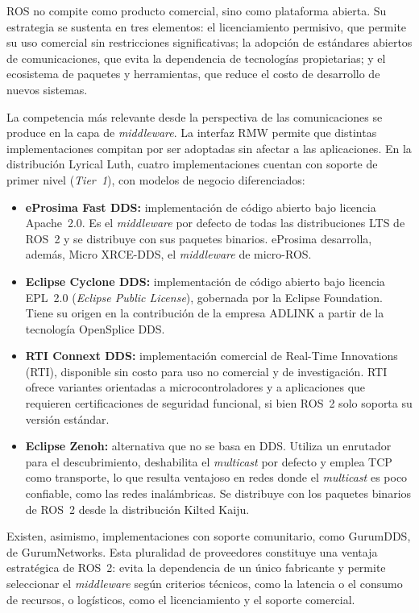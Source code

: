 ROS no compite como producto comercial, sino como plataforma abierta. Su
estrategia se sustenta en tres elementos: el licenciamiento permisivo, que
permite su uso comercial sin restricciones significativas; la adopción de
estándares abiertos de comunicaciones, que evita la dependencia de tecnologías
propietarias; y el ecosistema de paquetes y herramientas, que reduce el costo
de desarrollo de nuevos sistemas.

La competencia más relevante desde la perspectiva de las comunicaciones se
produce en la capa de \textit{middleware}. La interfaz RMW permite que
distintas implementaciones compitan por ser adoptadas sin afectar a las
aplicaciones. En la distribución Lyrical Luth, cuatro implementaciones cuentan
con soporte de primer nivel (\textit{Tier~1}), con modelos de negocio
diferenciados:
\begin{itemize}
    \item \textbf{eProsima Fast DDS:} implementación de código abierto bajo
    licencia Apache~2.0. Es el \textit{middleware} por defecto de todas las
    distribuciones LTS de ROS~2 y se distribuye con sus paquetes binarios.
    eProsima desarrolla, además, Micro XRCE-DDS, el \textit{middleware} de
    micro-ROS.
    \item \textbf{Eclipse Cyclone DDS:} implementación de código abierto bajo
    licencia EPL~2.0 (\textit{Eclipse Public License}), gobernada por la
    Eclipse Foundation. Tiene su origen en la contribución de la empresa ADLINK
    a partir de la tecnología OpenSplice DDS.
    \item \textbf{RTI Connext DDS:} implementación comercial de Real-Time
    Innovations (RTI), disponible sin costo para uso no comercial y de
    investigación. RTI ofrece variantes orientadas a microcontroladores y a
    aplicaciones que requieren certificaciones de seguridad funcional, si
    bien ROS~2 solo soporta su versión estándar.
    \item \textbf{Eclipse Zenoh:} alternativa que no se basa en DDS. Utiliza
    un enrutador para el descubrimiento, deshabilita el \textit{multicast} por
    defecto y emplea TCP como transporte, lo que resulta ventajoso en redes
    donde el \textit{multicast} es poco confiable, como las redes
    inalámbricas. Se distribuye con los paquetes binarios de ROS~2 desde la
    distribución Kilted Kaiju.
\end{itemize}

Existen, asimismo, implementaciones con soporte comunitario, como GurumDDS, de
GurumNetworks. Esta pluralidad de proveedores constituye una ventaja
estratégica de ROS~2: evita la dependencia de un único fabricante y permite
seleccionar el \textit{middleware} según criterios técnicos, como la latencia o
el consumo de recursos, o logísticos, como el licenciamiento y el soporte
comercial.

